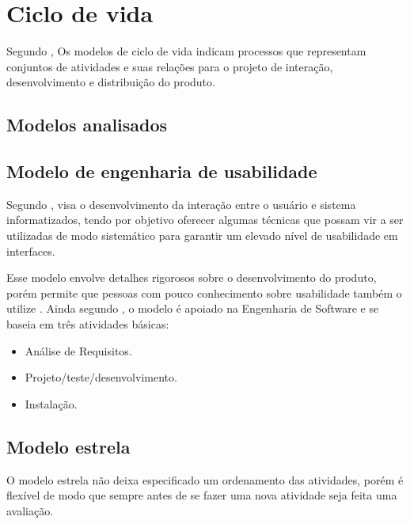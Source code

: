 \chapter{Ciclo de vida}


  Segundo \cite{ihc}, Os modelos de ciclo de vida indicam processos que representam conjuntos de atividades e suas relações para o projeto de interação, 
  desenvolvimento e distribuição do produto.
  
    \section{Modelos analisados}
    
      \section{Modelo de engenharia de usabilidade}
  
  Segundo \cite{engusabilidade}, visa o desenvolvimento da interação entre o usuário e sistema informatizados, tendo por objetivo oferecer algumas técnicas 
  que possam vir a ser utilizadas de modo sistemático para garantir um elevado nível de usabilidade em interfaces. 
  
  Esse modelo envolve detalhes rigorosos sobre o desenvolvimento do produto, porém permite que pessoas com pouco conhecimento sobre usabilidade também o utilize \cite{ihc}. 
  Ainda segundo \cite{ihc}, o modelo é apoiado na Engenharia de Software e se baseia em três atividades básicas:

  
  \begin{itemize}
       \item Análise de Requisitos.

       \item Projeto/teste/desenvolvimento.

       \item Instalação.
       
  \end{itemize}
  
    
        
       \section{Modelo estrela}
       
       O modelo estrela não deixa especificado um ordenamento das atividades, porém é flexível  de modo que sempre antes de se fazer uma nova atividade 
       seja feita uma avaliação. \cite{guiaderef}
       
